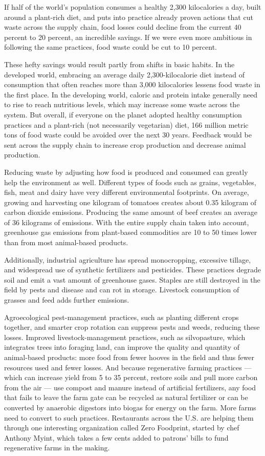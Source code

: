 \documentclass[a4paper]{article}
\begin{document}
If half of the world's population consumes a healthy 2,300 kilocalories a day, built around a plant-rich diet, and puts into practice already proven actions that cut waste across the supply chain, food losses could decline from the current 40 percent to 20 percent, an incredible savings. If we were even more ambitious in following the same practices, food waste could be cut to 10 percent.

These hefty savings would result partly from shifts in basic habits. In the developed world, embracing an average daily 2,300-kilocalorie diet instead of consumption that often reaches more than 3,000 kilocalories lessens food waste in the first place. In the developing world, caloric and protein intake generally need to rise to reach nutritious levels, which may increase some waste across the system. But overall, if everyone on the planet adopted healthy consumption practices and a plant-rich (not necessarily vegetarian) diet, 166 million metric tons of food waste could be avoided over the next 30 years. Feedback would be sent across the supply chain to increase crop production and decrease animal production.

Reducing waste by adjusting how food is produced and consumed can greatly help the environment as well. Different types of foods such as grains, vegetables, fish, meat and dairy have very different environmental footprints. On average, growing and harvesting one kilogram of tomatoes creates about 0.35 kilogram of carbon dioxide emissions. Producing the same amount of beef creates an average of 36 kilograms of emissions. With the entire supply chain taken into account, greenhouse gas emissions from plant-based commodities are 10 to 50 times lower than from most animal-based products.

Additionally, industrial agriculture has spread monocropping, excessive tillage, and widespread use of synthetic fertilizers and pesticides. These practices degrade soil and emit a vast amount of greenhouse gases. Staples are still destroyed in the field by pests and disease and can rot in storage. Livestock consumption of grasses and feed adds further emissions.

Agroecological pest-management practices, such as planting different crops together, and smarter crop rotation can suppress pests and weeds, reducing these losses. Improved livestock-management practices, such as silvopasture, which integrates trees into foraging land, can improve the quality and quantity of animal-based products: more food from fewer hooves in the field and thus fewer resources used and fewer losses. And because regenerative farming practices --- which can increase yield from 5 to 35 percent, restore soils and pull more carbon from the air --- use compost and manure instead of artificial fertilizers, any food that fails to leave the farm gate can be recycled as natural fertilizer or can be converted by anaerobic digestors into biogas for energy on the farm. More farms need to convert to such practices. Restaurants across the U.S. are helping them through one interesting organization called Zero Foodprint, started by chef Anthony Myint, which takes a few cents added to patrons' bills to fund regenerative farms in the making.
\end{document}
